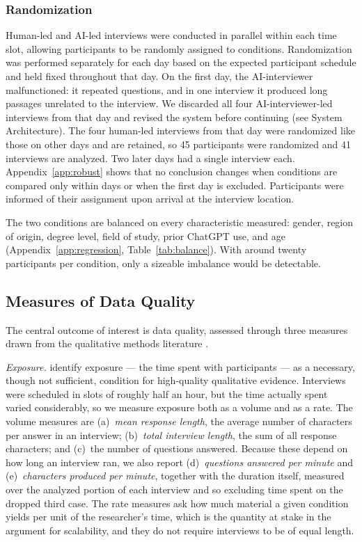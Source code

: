 \documentclass[12pt]{article}
\newcommand{\AII}{AI-interviewer}
\begin{document}
\subsubsection*{Randomization}

Human-led and AI-led interviews were conducted in parallel within each time slot, allowing participants to be randomly assigned to conditions. Randomization was performed separately for each day based on the expected participant schedule and held fixed throughout that day. On the first day, the \AII{} malfunctioned: it repeated questions, and in one interview it produced long passages unrelated to the interview. We discarded all four \AII{}-led interviews from that day and revised the system before continuing (see System Architecture). The four human-led interviews from that day were randomized like those on other days and are retained, so 45 participants were randomized and 41 interviews are analyzed. Two later days had a single interview each. Appendix~\ref{app:robust} shows that no conclusion changes when conditions are compared only within days or when the first day is excluded. Participants were informed of their assignment upon arrival at the interview location.

The two conditions are balanced on every characteristic measured: gender, region of origin, degree level, field of study, prior ChatGPT use, and age (Appendix~\ref{app:regression}, Table~\ref{tab:balance}). With around twenty participants per condition, only a sizeable imbalance would be detectable.

\subsection*{Measures of Data Quality}

The central outcome of interest is data quality, assessed through three measures drawn from the qualitative methods literature \citep{SmallCalarco2022}.

\textit{Exposure.} \citet{SmallCalarco2022} identify exposure --- the time spent with participants --- as a necessary, though not sufficient, condition for high-quality qualitative evidence. Interviews were scheduled in slots of roughly half an hour, but the time actually spent varied considerably, so we measure exposure both as a volume and as a rate. The volume measures are (a)~\textit{mean response length}, the average number of characters per answer in an interview; (b)~\textit{total interview length}, the sum of all response characters; and (c)~the number of questions answered. Because these depend on how long an interview ran, we also report (d)~\textit{questions answered per minute} and (e)~\textit{characters produced per minute}, together with the duration itself, measured over the analyzed portion of each interview and so excluding time spent on the dropped third case. The rate measures ask how much material a given condition yields per unit of the researcher's time, which is the quantity at stake in the argument for scalability, and they do not require interviews to be of equal length.
\end{document}
